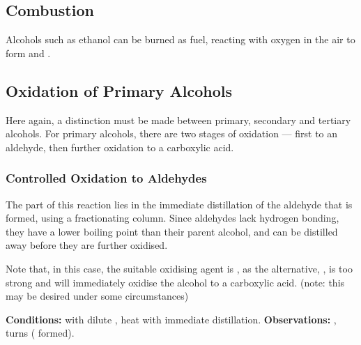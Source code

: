 		\pagebreak
		\subsection{Combustion}

			Alcohols such as ethanol can be burned as fuel, reacting with oxygen in the air to form  and .



		\subsection{Oxidation of Primary Alcohols}

			Here again, a distinction must be made between primary, secondary and tertiary alcohols. For primary alcohols, there
			are two stages of oxidation --- first to an aldehyde, then further oxidation to a carboxylic acid.

			\hypertarget{OxidationOfPrimaryAlcohols}{}
			\subsubsection{Controlled Oxidation to Aldehydes}

				The  part of this reaction lies in the immediate distillation of the aldehyde that is formed, using
				a fractionating column. Since aldehydes lack hydrogen bonding, they have a lower boiling point than their parent alcohol,
				and can be distilled away before they are further oxidised.

				Note that, in this case, the  suitable oxidising agent is , as the alternative, , is
				too strong and will immediately oxidise the alcohol to a carboxylic acid. (note: this may be desired under some circumstances)


				\vspace{1.5em}
				\vbox{\textbf{Conditions:}	\tabto{35mm} with dilute ,
											\tabto{35mm}heat with immediate distillation.}
				\vspace{0.75em}
				\vbox{\textbf{Observations:}\tabto{35mm} , turns 
														( formed).}

